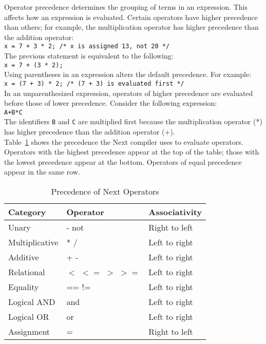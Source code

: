 \documentclass[12pt]{article}
\begin{document}
Operator precedence determines the grouping of terms in an expression.  This affects how an expression is evaluated.  Certain operators have higher precedence than others; for example, the multiplication operator has higher precedence than the addition operator: \\

\texttt{x = 7 + 3 * 2; \hspace{20 mm}  /* x is assigned 13, not 20 */} \\

\noindent The previous statement is equivalent to the following: \\

\texttt{x = 7 + (3 * 2);} \\

\noindent Using parentheses in an expression alters the default precedence.  For example: \\

\texttt{x = (7 + 3) * 2; \hspace{20 mm} /* (7 + 3) is evaluated first */} \\

\noindent In an unparenthesized expression, operators of higher precedence are evaluated before those of lower precedence.  Consider the following expression: \\

\texttt{A+B*C} \\

\noindent The identifiers \texttt{B} and \texttt{C} are multiplied first because the multiplication operator (*) has higher precedence than the addition operator (+). \\

\noindent Table~\ref{precedence} shows the precedence the Next compiler uses to evaluate operators.  Operators with the highest precedence appear at the top of the table; those with the lowest precedence appear at the bottom.  Operators of equal precedence appear in the same row. \\

\begin{table}[htdp]
\caption{Precedence of Next Operators}
\begin{center}
\begin{tabular}{|l|l|l|}
\hline
\textbf{Category} & \textbf{Operator} & \textbf{Associativity} \\
\hline
Unary & - not & Right to left \\
\hline
Multiplicative & * / & Left to right \\
\hline
Additive & + - & Left to right \\
\hline
Relational & $<$ $<=$ $>$ $>=$ & Left to right \\
\hline
Equality & == != & Left to right \\
\hline
Logical AND & and & Left to right \\
\hline
Logical OR & or & Left to right \\
\hline
Assignment & = & Right to left \\
\hline
\end{tabular}
\end{center}
\label{precedence}
\end{table} 
\end{document}
